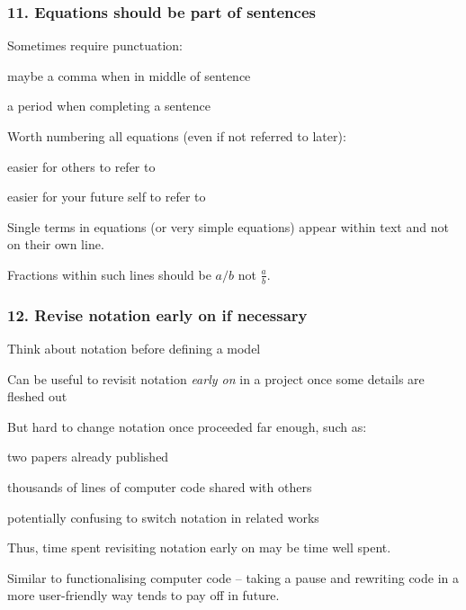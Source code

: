 \begin{frame}
\frametitle{11. Equations should be part of sentences}

Sometimes require punctuation:
\bi
\item maybe a comma when in middle of sentence
\item a period when completing a sentence
\ei

\pause

Worth numbering all equations (even if not referred to later):
\bi
\item easier for others to refer to
\item easier for your future self to refer to
\ei

\pause

\medskip

Single terms in equations (or very simple equations) appear within
text and not on their own line.

\medskip

Fractions within such lines should be $a/b$ not $\frac{a}{b}$.

\end{frame}


\begin{frame}
\frametitle{12. Revise notation early on if necessary}

\bi
\item Think about notation before defining a model
\item Can be useful to revisit notation \emph{early on} in a project once some
  details are fleshed out
\item But hard to change notation once proceeded far enough, such as:
  \bi
  \item two papers already published
  \item thousands of lines of computer code shared with others
    \bi
  \item potentially confusing to switch notation in related works
    \ei
    \ei
\ei

Thus, time spent revisiting notation early on may be time well spent.

\pause

\medskip

Similar to functionalising computer code -- taking a
pause and rewriting code in a more user-friendly way tends to pay off in future.

\end{frame}

